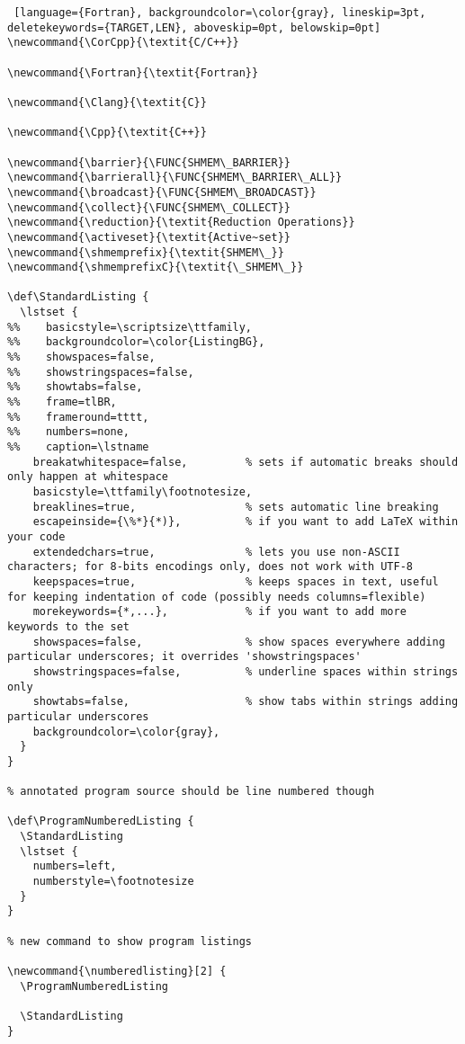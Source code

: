 {\begin{lstlisting} [language={Fortran}, backgroundcolor=\color{gray}, lineskip=3pt, deletekeywords={TARGET,LEN}, aboveskip=0pt, belowskip=0pt]
\newcommand{\CorCpp}{\textit{C/C++}}

\newcommand{\Fortran}{\textit{Fortran}}

\newcommand{\Clang}{\textit{C}}

\newcommand{\Cpp}{\textit{C++}}

\newcommand{\barrier}{\FUNC{SHMEM\_BARRIER}}
\newcommand{\barrierall}{\FUNC{SHMEM\_BARRIER\_ALL}}
\newcommand{\broadcast}{\FUNC{SHMEM\_BROADCAST}}
\newcommand{\collect}{\FUNC{SHMEM\_COLLECT}}
\newcommand{\reduction}{\textit{Reduction Operations}}
\newcommand{\activeset}{\textit{Active~set}}
\newcommand{\shmemprefix}{\textit{SHMEM\_}}
\newcommand{\shmemprefixC}{\textit{\_SHMEM\_}}

\def\StandardListing {
  \lstset {
%%    basicstyle=\scriptsize\ttfamily,
%%    backgroundcolor=\color{ListingBG},
%%    showspaces=false,
%%    showstringspaces=false,
%%    showtabs=false,
%%    frame=tlBR,
%%    frameround=tttt,
%%    numbers=none,
%%    caption=\lstname
    breakatwhitespace=false,         % sets if automatic breaks should only happen at whitespace
    basicstyle=\ttfamily\footnotesize,
    breaklines=true,                 % sets automatic line breaking
    escapeinside={\%*}{*)},          % if you want to add LaTeX within your code
    extendedchars=true,              % lets you use non-ASCII characters; for 8-bits encodings only, does not work with UTF-8
    keepspaces=true,                 % keeps spaces in text, useful for keeping indentation of code (possibly needs columns=flexible)
    morekeywords={*,...},            % if you want to add more keywords to the set
    showspaces=false,                % show spaces everywhere adding particular underscores; it overrides 'showstringspaces'
    showstringspaces=false,          % underline spaces within strings only
    showtabs=false,                  % show tabs within strings adding particular underscores
    backgroundcolor=\color{gray}, 
  }
}

% annotated program source should be line numbered though

\def\ProgramNumberedListing {
  \StandardListing
  \lstset {
    numbers=left,
    numberstyle=\footnotesize
  }
}

% new command to show program listings

\newcommand{\numberedlisting}[2] {
  \ProgramNumberedListing
  
  \StandardListing
}


\end{lstlisting}}
